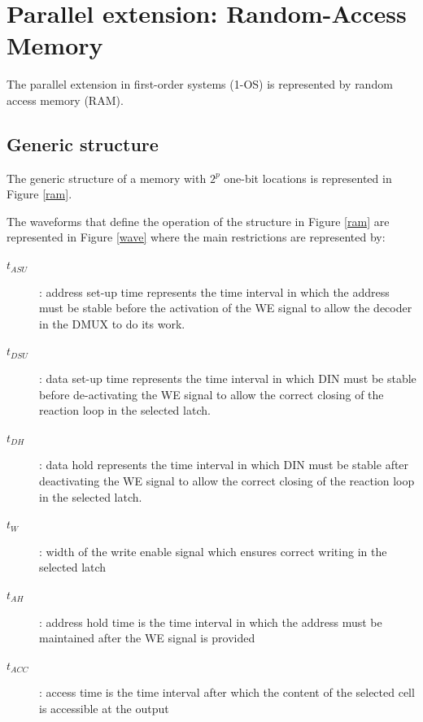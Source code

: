 \section{Parallel extension: Random-Access Memory}

The parallel extension in first-order systems (1-OS) is represented by random access memory (RAM).

\subsection{Generic structure}

The generic structure of a memory with $2^p$ one-bit locations is represented in Figure \ref{ram}.


The waveforms that define the operation of the structure in Figure \ref{ram} are represented in Figure \ref{wave} where the main restrictions are represented by:
\begin{description}
    \item[$t_{ASU}$]: address set-up time represents the time interval in which the address must be stable before the activation of the WE signal to allow the decoder in the DMUX to do its work.
    \item[$t_{DSU}$]: data set-up time represents the time interval in which DIN must be stable before de-activating the WE signal to allow the correct closing of the reaction loop in the selected latch.
    \item[$t_{DH}$]: data hold represents the time interval in which DIN must be stable after deactivating the WE signal to allow the correct closing of the reaction loop in the selected latch.   
    \item[$t_{W}$]: width of the write enable signal which ensures correct writing in the selected latch
    \item[$t_{AH}$]: address hold time is the time interval in which the address must be maintained after the WE signal is provided
    \item[$t_{ACC}$]: access time is the time interval after which the content of the selected cell is accessible at the output
\end{description}

